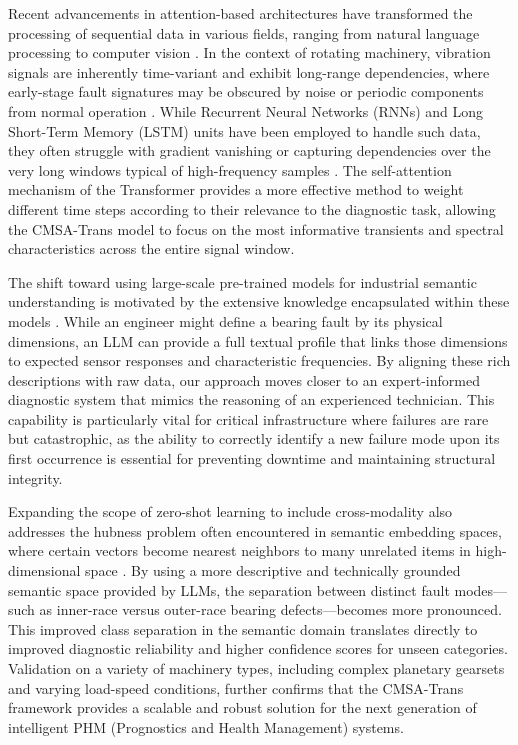 \documentclass[journal]{IEEEtran}
\begin{document}
Recent advancements in attention-based architectures have transformed the processing of sequential data in various fields, ranging from natural language processing to computer vision \cite{devlin2018bert, dosovitskiy2020image}. In the context of rotating machinery, vibration signals are inherently time-variant and exhibit long-range dependencies, where early-stage fault signatures may be obscured by noise or periodic components from normal operation \cite{zhang2021attention}. While Recurrent Neural Networks (RNNs) and Long Short-Term Memory (LSTM) units have been employed to handle such data, they often struggle with gradient vanishing or capturing dependencies over the very long windows typical of high-frequency samples \cite{hochreiter1997long}. The self-attention mechanism of the Transformer provides a more effective method to weight different time steps according to their relevance to the diagnostic task, allowing the CMSA-Trans model to focus on the most informative transients and spectral characteristics across the entire signal window.

The shift toward using large-scale pre-trained models for industrial semantic understanding is motivated by the extensive knowledge encapsulated within these models \cite{zhao2023brain}. While an engineer might define a bearing fault by its physical dimensions, an LLM can provide a full textual profile that links those dimensions to expected sensor responses and characteristic frequencies. By aligning these rich descriptions with raw data, our approach moves closer to an expert-informed diagnostic system that mimics the reasoning of an experienced technician. This capability is particularly vital for critical infrastructure where failures are rare but catastrophic, as the ability to correctly identify a new failure mode upon its first occurrence is essential for preventing downtime and maintaining structural integrity.

Expanding the scope of zero-shot learning to include cross-modality also addresses the hubness problem often encountered in semantic embedding spaces, where certain vectors become nearest neighbors to many unrelated items in high-dimensional space \cite{radovanovic2010hubs}. By using a more descriptive and technically grounded semantic space provided by LLMs, the separation between distinct fault modes---such as inner-race versus outer-race bearing defects---becomes more pronounced. This improved class separation in the semantic domain translates directly to improved diagnostic reliability and higher confidence scores for unseen categories. Validation on a variety of machinery types, including complex planetary gearsets and varying load-speed conditions, further confirms that the CMSA-Trans framework provides a scalable and robust solution for the next generation of intelligent PHM (Prognostics and Health Management) systems.
\end{document}
